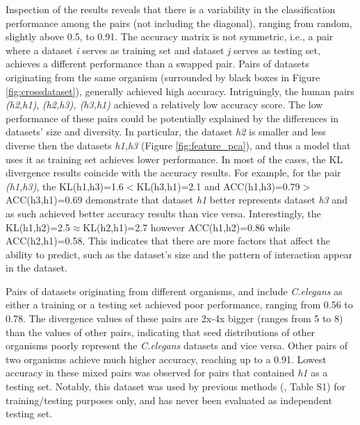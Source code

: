 \documentclass{bmcart}
\begin{document}
Inspection of the results reveals that there is a variability in the classification performance among the pairs (not including the diagonal), ranging from random, slightly above 0.5, to 0.91. The accuracy matrix is not symmetric, i.e., a pair where a dataset \textit{i} serves as training set and dataset \textit{j} serves as testing set, achieves a different performance than a swapped pair. Pairs of datasets originating from the same organism (surrounded by black boxes in Figure \ref{fig:crossdataset}), generally achieved high accuracy. Intriguingly, the human pairs \textit{(h2,h1)}, \textit{(h2,h3), \textit{(h3,h1)}} achieved a relatively low accuracy score. The low performance of these pairs could be potentially explained by the differences in datasets' size and diversity. In particular, the dataset \textit{h2} is smaller and less diverse then the datasets \textit{h1,h3} (Figure \ref{fig:feature_pca}), and thus a model that uses it as training set achieves lower performance. In most of the cases, the KL divergence results coincide with the accuracy results. For example, for the pair \textit{(h1,h3)}, the KL(h1,h3)=1.6$<$KL(h3,h1)=2.1 and ACC(h1,h3)=0.79$>$ACC(h3,h1)=0.69 demonstrate that dataset \textit{h1} better represents dataset \textit{h3} and as such achieved better accuracy results than vice versa. Interestingly, the KL(h1,h2)=2.5$\approx$KL(h2,h1)=2.7 however ACC(h1,h2)=0.86 while ACC(h2,h1)=0.58. This indicates that there are more factors that affect the ability to predict, such as the dataset's size and  the pattern of interaction appear in the dataset.

Pairs of datasets originating from different organisms, and include \textit{C.elegans} as either a training or a testing set achieved poor performance, ranging from 0.56 to 0.78. The divergence values of these pairs are 2x-4x bigger (ranges from 5 to 8) than the values of other pairs, indicating that seed distributions of other organisms poorly represent the \textit{C.elegans} datasets and vice versa. Other pairs of two organisms achieve much higher accuracy, reaching up to a 0.91. Lowest accuracy in these mixed pairs was observed for pairs that contained \textit{h1} as a testing set. Notably, this dataset was used by previous methods (, Table S1) for training/testing purposes only, and has never been evaluated as independent testing set.     

\end{document}
